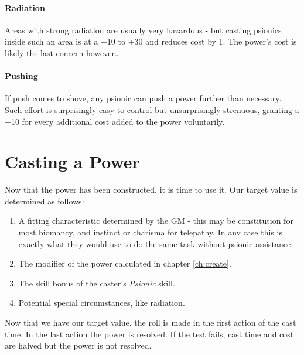 \documentclass[12pt,a4paper,openany,usenames,dvipsnames]{book}
\begin{document}
	\subsubsection{Radiation}
	Areas with strong radiation are usually very hazardous - but casting psionics inside such an area is at a +10 to +30 and reduces cost by 1. The power’s cost is likely the last concern however…
	\subsubsection{Pushing}
	If push comes to shove, any psionic can push a power further than necessary. Such effort is surprisingly easy to control but unsurprisingly strenuous, granting a +10 for every additional cost added to the power voluntarily.

	\chapter{Casting a Power}
	Now that the power has been constructed, it is time to use it. Our target value is determined as follows:
	\begin{enumerate}
		\item A fitting characteristic determined by the GM - this may be constitution for most biomancy, and instinct or charisma for telepathy. In any case this is exactly what they would use to do the same task without psionic assistance.
		\item The modifier of the power calculated in chapter \ref{ch:create}.
		\item The skill bonus of the caster's \emph{Psionic} skill.
		\item Potential special circumstances, like radiation.
	\end{enumerate}
	Now that we have our target value, the roll is made in the first action of the cast time. In the last action the power is resolved. If the test fails, cast time and cost are halved but the power is not resolved.
\end{document}
